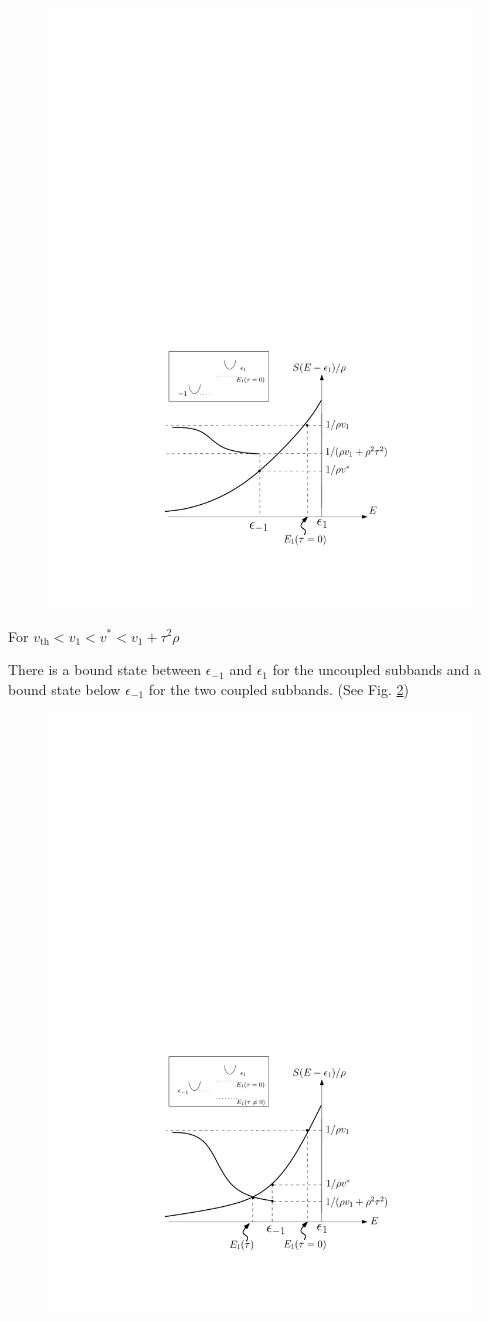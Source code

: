 \documentclass[11pt]{article} %
\begin{document}
\begin{figure}[htb]
	\centering
	       \includegraphics[width=.6\textwidth]{noBound}
			\caption{\label{fig:noBound}}
\end{figure}

For $v_{\text{th}}<v_1<v^{*}<v_1+\tau^2\rho$

There is a bound state between $\epsilon_{-1}$ and $\epsilon_1$ for the uncoupled subbands and a bound state below $\epsilon_{-1}$ for the two coupled subbands.  (See Fig. \ref{fig:bound})

\begin{figure}[htb]
	\centering
	       \includegraphics[width=.6\textwidth]{bound}
			\caption{\label{fig:bound}}
\end{figure}
\end{document}
